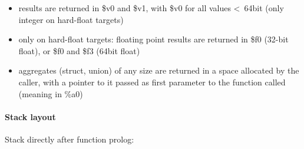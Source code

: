 \begin{itemize}
\item results are returned in \$v0 and \$v1, with \$v0 for all values \textless\ 64bit (only integer on hard-float targets)
\item only on hard-float targets: floating point results are returned in \$f0 (32-bit float), or \$f0 and \$f3 (64bit float)
\item aggregates (struct, union) of any size are returned in a space allocated by the caller, with a pointer to it
passed as first parameter to the function called (meaning in \%a0)
\end{itemize}

\paragraph{Stack layout}

Stack directly after function prolog:\\

